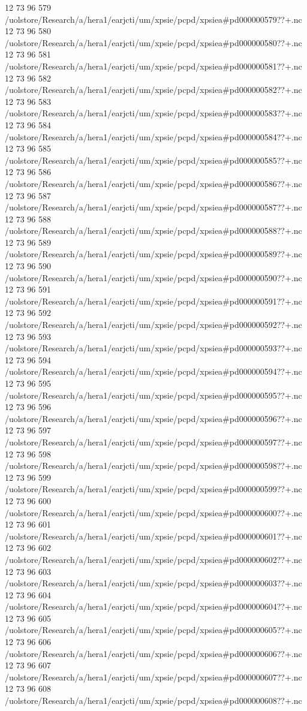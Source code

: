 12 73 96
579
/uolstore/Research/a/hera1/earjcti/um/xpsie/pcpd/xpsiea#pd000000579??+.nc
12 73 96
580
/uolstore/Research/a/hera1/earjcti/um/xpsie/pcpd/xpsiea#pd000000580??+.nc
12 73 96
581
/uolstore/Research/a/hera1/earjcti/um/xpsie/pcpd/xpsiea#pd000000581??+.nc
12 73 96
582
/uolstore/Research/a/hera1/earjcti/um/xpsie/pcpd/xpsiea#pd000000582??+.nc
12 73 96
583
/uolstore/Research/a/hera1/earjcti/um/xpsie/pcpd/xpsiea#pd000000583??+.nc
12 73 96
584
/uolstore/Research/a/hera1/earjcti/um/xpsie/pcpd/xpsiea#pd000000584??+.nc
12 73 96
585
/uolstore/Research/a/hera1/earjcti/um/xpsie/pcpd/xpsiea#pd000000585??+.nc
12 73 96
586
/uolstore/Research/a/hera1/earjcti/um/xpsie/pcpd/xpsiea#pd000000586??+.nc
12 73 96
587
/uolstore/Research/a/hera1/earjcti/um/xpsie/pcpd/xpsiea#pd000000587??+.nc
12 73 96
588
/uolstore/Research/a/hera1/earjcti/um/xpsie/pcpd/xpsiea#pd000000588??+.nc
12 73 96
589
/uolstore/Research/a/hera1/earjcti/um/xpsie/pcpd/xpsiea#pd000000589??+.nc
12 73 96
590
/uolstore/Research/a/hera1/earjcti/um/xpsie/pcpd/xpsiea#pd000000590??+.nc
12 73 96
591
/uolstore/Research/a/hera1/earjcti/um/xpsie/pcpd/xpsiea#pd000000591??+.nc
12 73 96
592
/uolstore/Research/a/hera1/earjcti/um/xpsie/pcpd/xpsiea#pd000000592??+.nc
12 73 96
593
/uolstore/Research/a/hera1/earjcti/um/xpsie/pcpd/xpsiea#pd000000593??+.nc
12 73 96
594
/uolstore/Research/a/hera1/earjcti/um/xpsie/pcpd/xpsiea#pd000000594??+.nc
12 73 96
595
/uolstore/Research/a/hera1/earjcti/um/xpsie/pcpd/xpsiea#pd000000595??+.nc
12 73 96
596
/uolstore/Research/a/hera1/earjcti/um/xpsie/pcpd/xpsiea#pd000000596??+.nc
12 73 96
597
/uolstore/Research/a/hera1/earjcti/um/xpsie/pcpd/xpsiea#pd000000597??+.nc
12 73 96
598
/uolstore/Research/a/hera1/earjcti/um/xpsie/pcpd/xpsiea#pd000000598??+.nc
12 73 96
599
/uolstore/Research/a/hera1/earjcti/um/xpsie/pcpd/xpsiea#pd000000599??+.nc
12 73 96
600
/uolstore/Research/a/hera1/earjcti/um/xpsie/pcpd/xpsiea#pd000000600??+.nc
12 73 96
601
/uolstore/Research/a/hera1/earjcti/um/xpsie/pcpd/xpsiea#pd000000601??+.nc
12 73 96
602
/uolstore/Research/a/hera1/earjcti/um/xpsie/pcpd/xpsiea#pd000000602??+.nc
12 73 96
603
/uolstore/Research/a/hera1/earjcti/um/xpsie/pcpd/xpsiea#pd000000603??+.nc
12 73 96
604
/uolstore/Research/a/hera1/earjcti/um/xpsie/pcpd/xpsiea#pd000000604??+.nc
12 73 96
605
/uolstore/Research/a/hera1/earjcti/um/xpsie/pcpd/xpsiea#pd000000605??+.nc
12 73 96
606
/uolstore/Research/a/hera1/earjcti/um/xpsie/pcpd/xpsiea#pd000000606??+.nc
12 73 96
607
/uolstore/Research/a/hera1/earjcti/um/xpsie/pcpd/xpsiea#pd000000607??+.nc
12 73 96
608
/uolstore/Research/a/hera1/earjcti/um/xpsie/pcpd/xpsiea#pd000000608??+.nc
